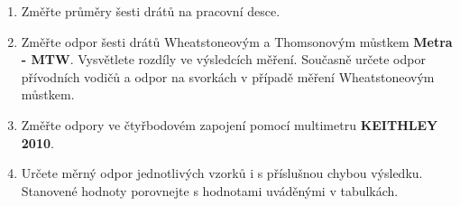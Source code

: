 \documentclass[0-protokol.tex]{subfiles}
\begin{document}
\begin{enumerate}
\item Změřte průměry šesti drátů na pracovní desce.
\item Změřte odpor šesti drátů Wheatstoneovým a Thomsonovým můstkem \textbf{Metra - MTW}. Vysvětlete rozdíly ve výsledcích měření. Současně určete odpor přívodních vodičů a odpor na svorkách v případě měření Wheatstoneovým můstkem.
\item Změřte odpory ve čtyřbodovém zapojení pomocí multimetru \textbf{KEITHLEY 2010}.
\item Určete měrný odpor jednotlivých vzorků i s příslušnou chybou výsledku. Stanovené hodnoty porovnejte s hodnotami uváděnými v tabulkách.
\end{enumerate}
\end{document}
